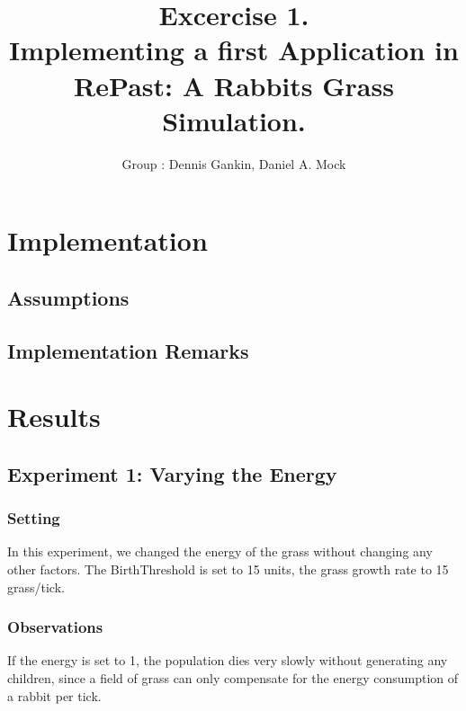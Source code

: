 \documentclass[11pt]{article}
\title{\bf Excercise 1.\\ Implementing a first Application in RePast: A Rabbits Grass Simulation.}
\author{Group \textnumero 29: Dennis Gankin, Daniel A. Mock}
\begin{document}
\maketitle

\section{Implementation}

\subsection{Assumptions}

\subsection{Implementation Remarks}

\section{Results}

\subsection{Experiment 1: Varying the Energy}

\subsubsection{Setting}
In this experiment, we changed the energy of the grass without changing any other factors.
The BirthThreshold is set to 15 units, the grass growth rate to 15 grass/tick.

\subsubsection{Observations}
If the energy is set to 1, the population dies very slowly without generating any children, since a field of grass can only compensate for the energy consumption of a rabbit per tick.
\end{document}
